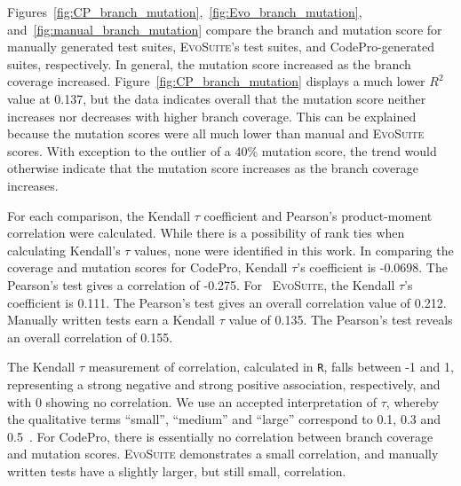 Figures~\ref{fig:CP_branch_mutation},~\ref{fig:Evo_branch_mutation}, and~\ref{fig:manual_branch_mutation} compare the branch and mutation score for manually generated test suites, \textsc{EvoSuite}'s test suites, and CodePro-generated suites, respectively.  In general, the mutation score increased as the branch coverage increased.  Figure~\ref{fig:CP_branch_mutation} displays a much lower $R^2$ value at 0.137, but the data indicates overall that the mutation score neither increases nor decreases with higher branch coverage. This can be explained because the mutation scores were all much lower than manual and \textsc{EvoSuite} scores. With exception to the outlier of a 40\% mutation score, the trend would otherwise indicate that the mutation score increases as the branch coverage increases.

  For each comparison, the Kendall $\tau$ coefficient and Pearson's product-moment correlation were calculated.  While there is a possibility of rank ties when calculating Kendall's $\tau$ values, none were identified in this work.  In comparing the coverage and mutation scores for CodePro, Kendall $\tau$'s coefficient is -0.0698.  The Pearson's test gives a correlation of -0.275. 
For ~\textsc{EvoSuite}, the Kendall $\tau$'s coefficient is 0.111.  The Pearson's test gives an overall correlation value of 0.212.  
Manually written tests earn a Kendall $\tau$ value of 0.135.  The Pearson's test reveals an overall correlation of 0.155.  

The Kendall $\tau$ measurement of correlation, calculated in {\tt R}, falls between -1 and 1, representing a strong negative and strong positive association, respectively, and with 0 showing no correlation. We use an accepted interpretation of $\tau$, whereby the qualitative terms ``small'', ``medium'' and ``large'' correspond to 0.1, 0.3 and 0.5~\cite{kraemer2003}.  For CodePro, there is essentially no correlation between branch coverage and mutation scores.  \textsc{EvoSuite} demonstrates a small correlation, and manually written tests have a slightly larger, but still small, correlation. 

